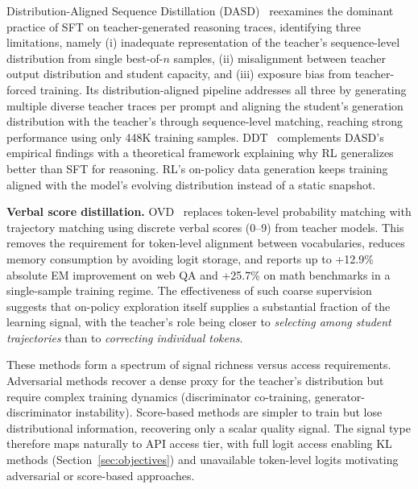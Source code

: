 \documentclass{article} %
\begin{document}
Distribution-Aligned Sequence Distillation (DASD)~\citep{2601.09088} reexamines the dominant practice of SFT on teacher-generated reasoning traces, identifying three limitations, namely (i) inadequate representation of the teacher's sequence-level distribution from single best-of-$n$ samples, (ii) misalignment between teacher output distribution and student capacity, and (iii) exposure bias from teacher-forced training. Its distribution-aligned pipeline addresses all three by generating multiple diverse teacher traces per prompt and aligning the student's generation distribution with the teacher's through sequence-level matching, reaching strong performance using only 448K training samples. DDT~\citep{2602.12222} complements DASD's empirical findings with a theoretical framework explaining why RL generalizes better than SFT for reasoning. RL's on-policy data generation keeps training aligned with the model's evolving distribution instead of a static snapshot.

\textbf{Verbal score distillation.} OVD~\citep{2601.21968} replaces token-level probability matching with trajectory matching using discrete verbal scores (0--9) from teacher models. This removes the requirement for token-level alignment between vocabularies, reduces memory consumption by avoiding logit storage, and reports up to +12.9\% absolute EM improvement on web QA and +25.7\% on math benchmarks in a single-sample training regime. The effectiveness of such coarse supervision suggests that on-policy exploration itself supplies a substantial fraction of the learning signal, with the teacher's role being closer to \emph{selecting among student trajectories} than to \emph{correcting individual tokens}.

These methods form a spectrum of signal richness versus access requirements. Adversarial methods recover a dense proxy for the teacher's distribution but require complex training dynamics (discriminator co-training, generator-discriminator instability). Score-based methods are simpler to train but lose distributional information, recovering only a scalar quality signal. The signal type therefore maps naturally to API access tier, with full logit access enabling KL methods (Section~\ref{sec:objectives}) and unavailable token-level logits motivating adversarial or score-based approaches.
\end{document}
